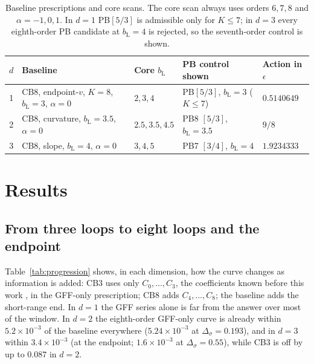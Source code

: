 \documentclass[11pt,a4paper]{article}
\numberwithin{equation}{section}
\newcommand{\Ds}{\Delta_\sigma}
\newcommand{\bL}{b_{\mathrm L}}
\newcommand{\sci}[2]{#1\times10^{#2}}
\begin{document}
\begin{table}[htbp]\centering\small\setlength{\tabcolsep}{4pt}
\begin{tabular}{@{}c l l l l@{}}
\toprule
$d$ & Baseline & Core $\bL$ & PB control shown & Action in $\epsilon$\\ \midrule
1 & CB8, endpoint-$v$, $K=8$, $\bL=3$, $\alpha=0$ & $2,3,4$ & PB$[5/3]$, $\bL=3$ ($K\le7$) & $0.5140649$\\
2 & CB8, curvature, $\bL=3.5$, $\alpha=0$ & $2.5,3.5,4.5$ & PB8 $[5/3]$, $\bL=3.5$ & $9/8$\\
3 & CB8, slope, $\bL=4$, $\alpha=0$ & $3,4,5$ & PB7 $[3/4]$, $\bL=4$ & $1.9234333$\\
\bottomrule
\end{tabular}
\caption{Baseline prescriptions and core scans. The core scan always uses orders $6,7,8$ and
$\alpha=-1,0,1$. In $d=1$ PB$[5/3]$ is admissible only for $K\le7$; in $d=3$ every eighth-order
PB candidate at $\bL=4$ is rejected, so the seventh-order control is shown.}
\label{tab:scans}
\end{table}

\section{Results}\label{sec:results}
\subsection{From three loops to eight loops and the endpoint}
Table~\ref{tab:progression} shows, in each dimension, how the curve changes as
information is added: CB3 uses only $C_0,\dots,C_3$, the coefficients known before this
work \cite{Benedetti:2020rrq}, in the GFF-only prescription; CB8 adds $C_4,\dots,C_8$; the baseline adds the
short-range end. In $d=1$ the GFF series alone is far from the answer over most of the
window. In $d=2$ the eighth-order GFF-only curve is already within $\sci{5.2}{-3}$ of the
baseline everywhere ($\sci{5.24}{-3}$ at $\Ds=0.193$), and in $d=3$ within $\sci{3.4}{-3}$ (at the endpoint;
$\sci{1.6}{-3}$ at $\Ds=0.55$), while CB3 is off by up to $0.087$ in $d=2$.
\end{document}
